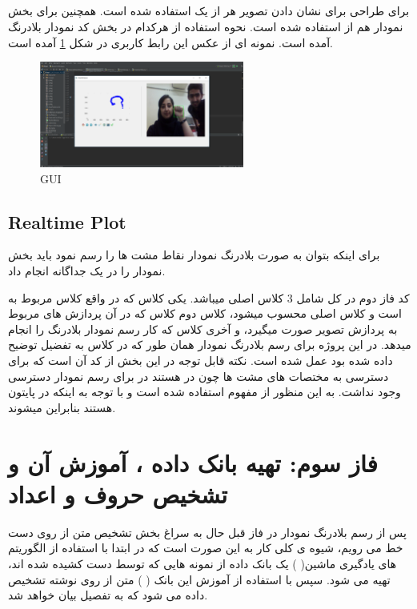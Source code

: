 \documentclass[oneside]{article}
\begin{document}
\subsection{}
برای طراحی 
برای نشان دادن تصویر هر 
از یک 
استفاده شده است. همچنین برای بخش نمودار هم از
استفاده شده است. نحوه استفاده از هرکدام در بخش کد نمودار بلادرنگ آمده است. نمونه ای از عکس این رابط کاربری در شکل
\ref{GUI}
آمده است.
\begin{figure}
\centering
\includegraphics[width=0.6\textwidth]{Pictures/5.png}
\caption{GUI}
\label{GUI}
\end{figure}

\subsection{Realtime Plot}
برای اینکه بتوان به صورت بلادرنگ نمودار نقاط مشت ها را رسم نمود باید بخش نمودار را در یک 
جداگانه انجام داد.

کد فاز دوم در کل شامل 3 کلاس اصلی میباشد. یکی کلاس 
که در واقع کلاس مربوط به 
است و کلاس اصلی محسوب میشود، کلاس دوم کلاس
که در آن پردازش های مربوط به پردازش تصویر صورت میگیرد، و آخری کلاس
که کار رسم نمودار بلادرنگ را انجام میدهد.
در این پروژه برای رسم بلادرنگ نمودار همان طور که در کلاس به تفضیل توضیح داده شده بود عمل شده است. نکته قابل توجه در این بخش از کد آن است که برای دسترسی به مختصات های مشت ها چون در 
هستند در 
برای رسم نمودار دسترسی وجود نداشت. به این منظور از مفهوم 
استفاده شده است و با توجه به اینکه 
در پایتون 
هستند بنابراین 
میشوند.
\section{فاز سوم: تهیه بانک داده ، آموزش آن و تشخیص حروف و اعداد}
پس از رسم بلادرنگ نمودار در فاز قبل حال به سراغ بخش تشخیص متن از روی دست خط می رویم، شیوه ی کلی کار به این صورت است که در ابتدا با استفاده از الگوریتم های یادگیری ماشین(
) یک بانک داده از نمونه هایی که توسط دست کشیده شده اند، تهیه می شود. سپس با استفاده از آموزش این بانک (
) متن از روی نوشته تشخیص داده می شود که به تفصیل بیان خواهد شد.
\end{document}
